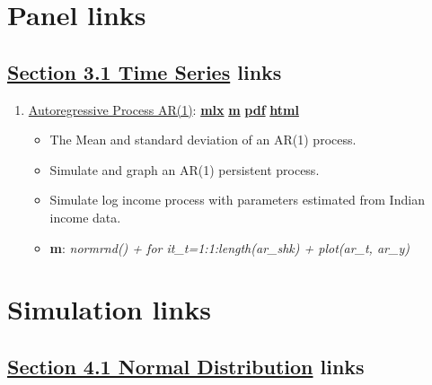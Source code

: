\documentclass[
]{book}
\providecommand{\tightlist}{%
  \setlength{\itemsep}{0pt}\setlength{\parskip}{0pt}}
\begin{document}
\hypertarget{panel-links}{%
\section{Panel links}\label{panel-links}}

\hypertarget{section-3.1-time-seriestime-series-links}{%
\subsection{\texorpdfstring{\protect\hyperlink{time-series}{Section 3.1 Time Series} links}{Section 3.1 Time Series links}}\label{section-3.1-time-seriestime-series-links}}

\begin{enumerate}
\def\labelenumi{\arabic{enumi}.}
\tightlist
\item
  \href{https://fanwangecon.github.io/M4Econ/panel/timeseries/htmlpdfm/fs_autoregressive.html}{Autoregressive Process AR(1)}: \href{https://github.com/FanWangEcon/M4Econ/blob/master/panel/timeseries/fs_autoregressive.mlx}{\textbf{mlx}} \textbar{} \href{https://github.com/FanWangEcon/M4Econ/blob/master/panel/timeseries/htmlpdfm/fs_autoregressive.m}{\textbf{m}} \textbar{} \href{https://github.com/FanWangEcon/M4Econ/blob/master/panel/timeseries/htmlpdfm/fs_autoregressive.pdf}{\textbf{pdf}} \textbar{} \href{https://fanwangecon.github.io/M4Econ/panel/timeseries/htmlpdfm/fs_autoregressive.html}{\textbf{html}}

  \begin{itemize}
  \tightlist
  \item
    The Mean and standard deviation of an AR(1) process.
  \item
    Simulate and graph an AR(1) persistent process.
  \item
    Simulate log income process with parameters estimated from Indian income data.
  \item
    \textbf{m}: \emph{normrnd() + for it\_t=1:1:length(ar\_shk) + plot(ar\_t, ar\_y)}
  \end{itemize}
\end{enumerate}

\hypertarget{simulation-links}{%
\section{Simulation links}\label{simulation-links}}

\hypertarget{section-4.1-normal-distributionnormal-distribution-links}{%
\subsection{\texorpdfstring{\protect\hyperlink{normal-distribution}{Section 4.1 Normal Distribution} links}{Section 4.1 Normal Distribution links}}\label{section-4.1-normal-distributionnormal-distribution-links}}
\end{document}
